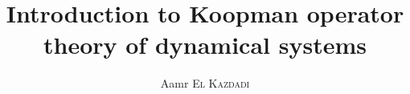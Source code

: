 \documentclass{article}
\begin{document}
\title{Introduction to Koopman operator theory of dynamical systems}
\author{Aamr \textsc{El Kazdadi}}
\date{}
\maketitle
\end{document}
